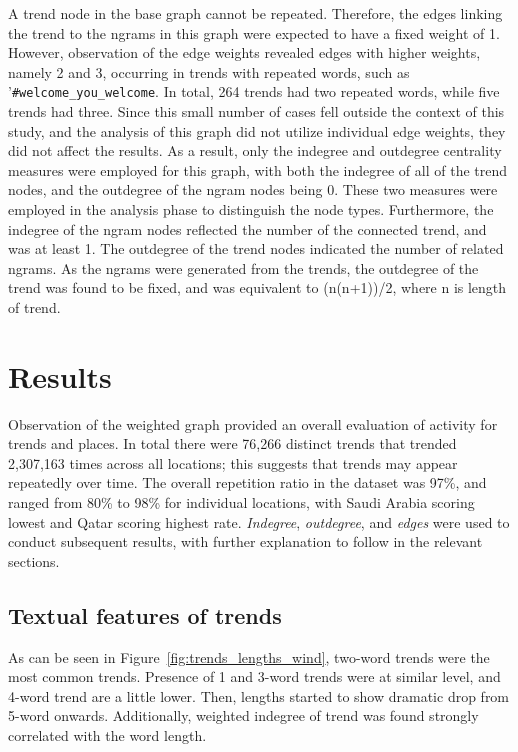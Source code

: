 \documentclass[conference]{IEEEtran}
\begin{document}
A trend node in the base graph cannot be repeated. Therefore, the edges linking 
the trend to the ngrams in this graph were expected to have a fixed weight of 1. 
However, observation of the edge weights revealed edges with higher weights, namely 
2 and 3, occurring in trends with repeated words, such as '{\texttt{\#welcome\_you\_welcome}}.
In total, 264 trends had two repeated words, while five trends had three. Since this small number 
of cases fell outside the context of this study, and the analysis of this graph did not utilize individual 
edge weights, they did not affect the results. As a result, only the indegree and outdegree 
centrality measures were employed for this graph, with both the indegree of all of the trend nodes, 
and the outdegree of the ngram nodes being 0. These two measures were employed in the analysis 
phase to distinguish the node types. Furthermore, the indegree of the ngram nodes reflected the 
number of the connected trend, and was at least 1. The outdegree of the trend nodes indicated 
the number of related ngrams. As the ngrams were generated from the trends, the outdegree of 
the trend was found to be fixed, and was equivalent to (n(n+1))/2, where n is length of trend.

\section{Results}\label{results}

Observation of the weighted graph provided an overall evaluation of
activity for trends and places. In total there were 76,266 distinct
trends that trended 2,307,163 times across all locations; this
suggests that trends may appear repeatedly over time. The overall
repetition ratio in the dataset was 97\%, and ranged from 80\% to 98\%
for individual locations, with Saudi Arabia scoring lowest and Qatar
scoring highest rate. {\emph{Indegree}}, {\emph{outdegree}}, and
{\emph{edges}} were used to conduct subsequent results, with further
explanation to follow in the relevant sections.

\subsection{Textual features of trends}
As can be seen in Figure~\ref{fig:trends_lengths_wind}, two-word trends 
were the most common trends. Presence of 1 and 3-word trends were at 
similar level, and 4-word trend are a little lower. Then, lengths started to 
show dramatic drop from 5-word onwards. Additionally, weighted indegree 
of trend was found strongly correlated with the word length.
\end{document}
